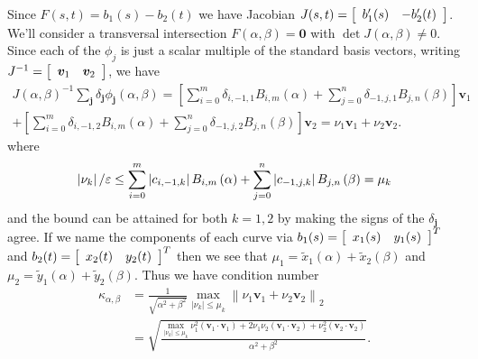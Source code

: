 Since \(F(s, t) = b_1(s) - b_2(t)\) we have Jacobian \(J(s, t) =
\left[ \begin{array}{c c} b_1'(s) & -b_2'(t) \end{array}\right]\). We'll
consider a transversal intersection \(F(\alpha, \beta) = \bm{0}\) with
\(\det J(\alpha, \beta) \neq 0\). Since each of the
\(\phi_j\) is just a scalar multiple of the standard basis
vectors, writing \(J^{-1} = \left[ \begin{array}{c c}
\bm{v}_1 & \bm{v}_2 \end{array}\right]\), we have
\begin{multline}
J\left(\alpha, \beta\right)^{-1} \sum_{\bm{j}} \delta_{\bm{j}}
  \phi_{\bm{j}}\left(\alpha, \beta\right) = \left[\sum_{i = 0}^m
  \delta_{i, -1, 1} B_{i, m}\left(\alpha\right) + \sum_{j = 0}^n
  \delta_{-1, j, 1} B_{j, n}\left(\beta\right)\right] \bm{v}_1 \\
+ \left[\sum_{i = 0}^m
  \delta_{i, -1, 2} B_{i, m}\left(\alpha\right) + \sum_{j = 0}^n
  \delta_{-1, j, 2} B_{j, n}\left(\beta\right)\right] \bm{v}_2 =
  \nu_1 \bm{v}_1 + \nu_2 \bm{v}_2.
\end{multline}
where
\begin{equation}\label{eq:nu-bounds}
\left|\nu_k\right| / \varepsilon \leq \sum_{i = 0}^m
  \left|c_{i, -1, k}\right| B_{i, m}\left(\alpha\right) + \sum_{j = 0}^n
  \left|c_{-1, j, k}\right| B_{j, n}\left(\beta\right) = \mu_k
\end{equation}
and the bound can be attained for both \(k = 1, 2\) by making the
signs of the \(\delta_{\bm{j}}\) agree. If we name the components of each
curve via
\(b_1(s) = \left[ \begin{array}{c c} x_1(s) & y_1(s) \end{array}\right]^T\)
and \(b_2(t) = \left[ \begin{array}{c c} x_2(t) & y_2(t) \end{array}\right]^T\)
then we see that \(\mu_1 = \widetilde{x}_1(\alpha) + \widetilde{x}_2(\beta)\)
and \(\mu_2 = \widetilde{y}_1(\alpha) + \widetilde{y}_2(\beta)\).
Thus we have condition number
\begin{align}
\kappa_{\alpha, \beta} &= \frac{1}{\sqrt{\alpha^2 + \beta^2}}
  \max_{\left|\nu_k\right| \leq \mu_k} \left \lVert \nu_1 \bm{v}_1 +
  \nu_2 \bm{v}_2 \right \rVert_2 \\
  &=
  \sqrt{\frac{\max_{\left|\nu_k\right| \leq \mu_k}
  \nu_1^2 \left(\bm{v}_1 \cdot \bm{v}_1\right) +
  2 \nu_1 \nu_2 \left(\bm{v}_1 \cdot \bm{v}_2\right) +
  \nu_2^2 \left(\bm{v}_2 \cdot \bm{v}_2\right)}{\alpha^2 + \beta^2}}
  \label{eq:intersect-cond-num}.
\end{align}
